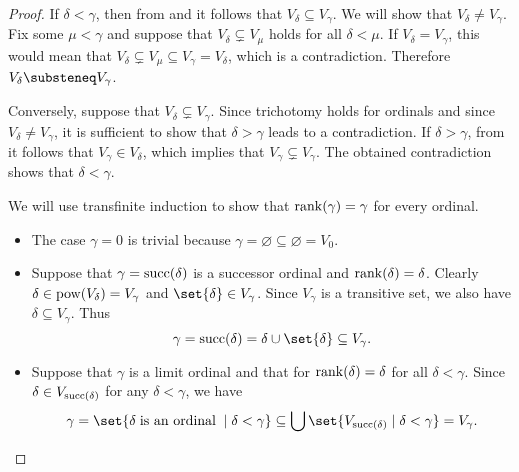 \begin{proof}
   If \( \delta < \gamma \), then from  and  it follows that \( V_\delta \subseteq V_\gamma \). We will show that \( V_\delta \neq V_\gamma \). Fix some \( \mu < \gamma \) and suppose that \( V_\delta \subsetneq V_\mu \) holds for all \( \delta < \mu \). If \( V_\delta = V_\gamma \), this would mean that \( V_\delta \subsetneq V_\mu \subseteq V_\gamma = V_\delta \), which is a contradiction. Therefore \( V_\delta \substeneq V_\gamma \).

  Conversely, suppose that \( V_\delta \subsetneq V_\gamma \). Since trichotomy holds for ordinals and since \( V_\delta \neq V_\gamma \), it is sufficient to show that \( \delta > \gamma \) leads to a contradiction. If \( \delta > \gamma \), from  it follows that \( V_\gamma \in V_\delta \), which implies that \( V_\gamma \subsetneq V_\gamma \). The obtained contradiction shows that \( \delta < \gamma \).

   We will use transfinite induction to show that \( \operatorname{rank}(\gamma) = \gamma \) for every ordinal.
  \begin{itemize}
    \item The case \( \gamma = 0 \) is trivial because \( \gamma = \varnothing \subseteq \varnothing = V_0 \).

    \item Suppose that \( \gamma = \operatorname{succ}(\delta) \) is a successor ordinal and \( \operatorname{rank}(\delta) = \delta \). Clearly \( \delta \in \operatorname{pow}(V_\delta) = V_\gamma \) and \( \set{ \delta } \in V_\gamma \). Since \( V_\gamma \) is a transitive set, we also have \( \delta \subseteq V_\gamma \). Thus
    \begin{equation*}
      \gamma = \op{succ}(\delta) = \delta \cup \set{ \delta } \subseteq V_\gamma.
    \end{equation*}

    \item Suppose that \( \gamma \) is a limit ordinal and that for \( \operatorname{rank}(\delta) = \delta \) for all \( \delta < \gamma \). Since \( \delta \in V_{\operatorname{succ}(\delta)} \) for any \( \delta < \gamma \), we have
    \begin{equation*}
      \gamma
      =
      \set{ \delta \T{is an ordinal} \given \delta < \gamma }
      \subseteq
      \bigcup\set{ V_{\op{succ}(\delta)} \given \delta < \gamma }
      =
      V_\gamma.
    \end{equation*}
  \end{itemize}
\end{proof}

